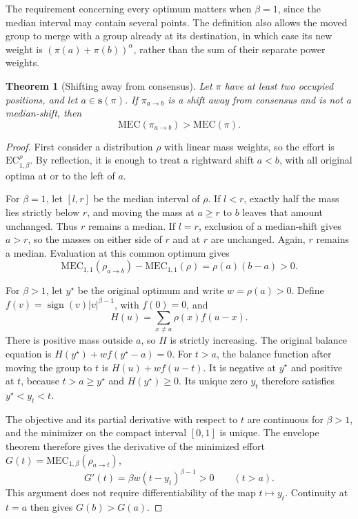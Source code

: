 \documentclass{article}
\theoremstyle{plain}
\newtheorem{theorem}{Theorem}
\theoremstyle{remark}
\begin{document}
The requirement concerning every optimum matters when $\beta=1$, since the median interval may contain several points. The definition also allows the moved group to merge with a group already at its destination, in which case its new weight is $(\pi(a)+\pi(b))^\alpha$, rather than the sum of their separate power weights.

\begin{theorem}[Shifting away from consensus]\label{th:mec-shifting-away}
Let $\pi$ have at least two occupied positions, and let $a\in\boldsymbol{s}(\pi)$. If $\pi_{a\to b}$ is a shift away from consensus and is not a median-shift, then
\[
\mathrm{MEC}(\pi_{a\to b})>\mathrm{MEC}(\pi).
\]
\end{theorem}
\begin{proof}
First consider a distribution $\rho$ with linear mass weights, so the effort is $\mathrm{EC}_{1,\beta}^{\rho}$. By reflection, it is enough to treat a rightward shift $a<b$, with all original optima at or to the left of $a$.

For $\beta=1$, let $[l,r]$ be the median interval of $\rho$. If $l<r$, exactly half the mass lies strictly below $r$, and moving the mass at $a\geq r$ to $b$ leaves that amount unchanged. Thus $r$ remains a median. If $l=r$, exclusion of a median-shift gives $a>r$, so the masses on either side of $r$ and at $r$ are unchanged. Again, $r$ remains a median. Evaluation at this common optimum gives
\[
\mathrm{MEC}_{1,1}(\rho_{a\to b})-
\mathrm{MEC}_{1,1}(\rho)=\rho(a)(b-a)>0.
\]

For $\beta>1$, let $y^\star$ be the original optimum and write $w=\rho(a)>0$. Define $f(v)=\operatorname{sign}(v)|v|^{\beta-1}$, with $f(0)=0$, and
\[
H(u)=\sum_{x\neq a}\rho(x)f(u-x).
\]
There is positive mass outside $a$, so $H$ is strictly increasing. The original balance equation is $H(y^\star)+wf(y^\star-a)=0$. For $t>a$, the balance function after moving the group to $t$ is $H(u)+wf(u-t)$. It is negative at $y^\star$ and positive at $t$, because $t>a\geq y^\star$ and $H(y^\star)\geq0$. Its unique zero $y_t$ therefore satisfies $y^\star<y_t<t$.

The objective and its partial derivative with respect to $t$ are continuous for $\beta>1$, and the minimizer on the compact interval $[0,1]$ is unique. The envelope theorem therefore gives the derivative of the minimized effort $G(t)=\mathrm{MEC}_{1,\beta}(\rho_{a\to t})$,
\[
G'(t)=\beta w(t-y_t)^{\beta-1}>0\qquad(t>a).
\]
This argument does not require differentiability of the map $t\mapsto y_t$. Continuity at $t=a$ then gives $G(b)>G(a)$.


\end{proof}
\end{document}

